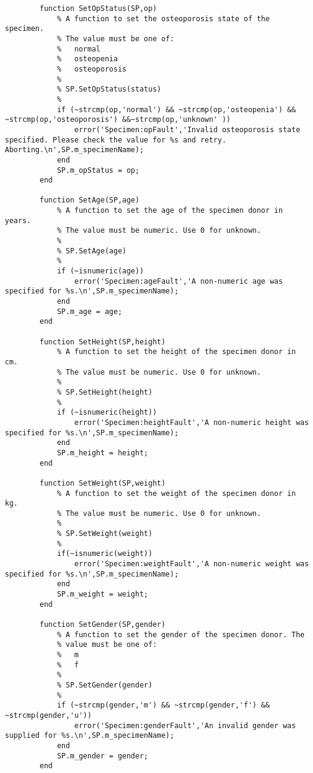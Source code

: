 \begin{lstlisting}
        function SetOpStatus(SP,op)
            % A function to set the osteoporosis state of the specimen.
            % The value must be one of:
            %   normal
            %   osteopenia
            %   osteoporosis
            %
            % SP.SetOpStatus(status)
            %
            if (~strcmp(op,'normal') && ~strcmp(op,'osteopenia') && ~strcmp(op,'osteoporosis') &&~strcmp(op,'unknown' ))
                error('Specimen:opFault','Invalid osteoporosis state specified. Please check the value for %s and retry. Aborting.\n',SP.m_specimenName);
            end
            SP.m_opStatus = op;
        end
        
        function SetAge(SP,age)
            % A function to set the age of the specimen donor in years.
            % The value must be numeric. Use 0 for unknown.
            %
            % SP.SetAge(age)
            %
            if (~isnumeric(age))
                error('Specimen:ageFault','A non-numeric age was specified for %s.\n',SP.m_specimenName);
            end
            SP.m_age = age;
        end
        
        function SetHeight(SP,height)
            % A function to set the height of the specimen donor in cm.
            % The value must be numeric. Use 0 for unknown.
            %
            % SP.SetHeight(height)
            %
            if (~isnumeric(height))
                error('Specimen:heightFault','A non-numeric height was specified for %s.\n',SP.m_specimenName);
            end
            SP.m_height = height;
        end
        
        function SetWeight(SP,weight)
            % A function to set the weight of the specimen donor in kg.
            % The value must be numeric. Use 0 for unknown.
            %
            % SP.SetWeight(weight)
            %
            if(~isnumeric(weight))
                error('Specimen:weightFault','A non-numeric weight was specified for %s.\n',SP.m_specimenName);
            end
            SP.m_weight = weight;
        end
        
        function SetGender(SP,gender)
            % A function to set the gender of the specimen donor. The
            % value must be one of:
            %   m
            %   f
            %
            % SP.SetGender(gender)
            %
            if (~strcmp(gender,'m') && ~strcmp(gender,'f') && ~strcmp(gender,'u'))
                error('Specimen:genderFault','An invalid gender was supplied for %s.\n',SP.m_specimenName);
            end
            SP.m_gender = gender;
        end
        

\end{lstlisting}
